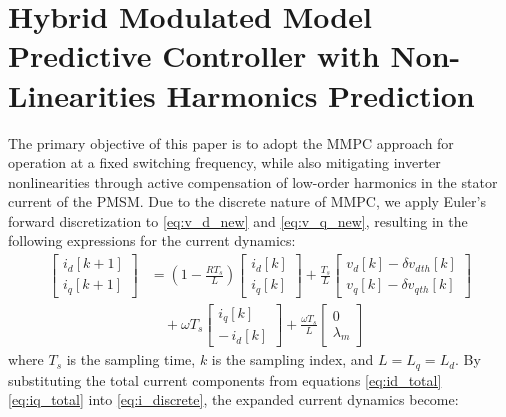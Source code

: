 \section{Hybrid Modulated Model Predictive Controller with Non-Linearities Harmonics Prediction}
The primary objective of this paper is to adopt the MMPC approach for operation at a fixed switching frequency, while also mitigating inverter nonlinearities through active compensation of low-order harmonics in the stator current of the PMSM. Due to the discrete nature of MMPC, we apply Euler’s forward discretization to \ref{eq:v_d_new} and \ref{eq:v_q_new}, resulting in the following expressions for the current dynamics:
\begin{equation}
\begin{aligned}
\begin{bmatrix}
i_d[k+1]\\
i_q[k+1]
\end{bmatrix}
&=
\left(1-\frac{R T_s}{L}\right)
\begin{bmatrix}
i_d[k]\\
i_q[k]
\end{bmatrix}
+
\frac{T_s}{L}
\begin{bmatrix}
v_d[k]-\delta v_d{}_{th}[k]\\
v_q[k]-\delta v_q{}_{th}[k]
\end{bmatrix} \\
&\quad
+ \omega T_s
\begin{bmatrix}
i_q[k]\\
-\,i_d[k]
\end{bmatrix}
+
\frac{\omega T_s}{L}
\begin{bmatrix}
0\\
\lambda_m
\end{bmatrix}
\end{aligned}
\label{eq:i_discrete}
\end{equation}
where  $T_s$ is the sampling time, $k$ is the sampling index, and $L=L_q=L_d$. By substituting the total current components from equations \ref{eq:id_total} \ref{eq:iq_total} into \ref{eq:i_discrete}, the expanded current dynamics become:

